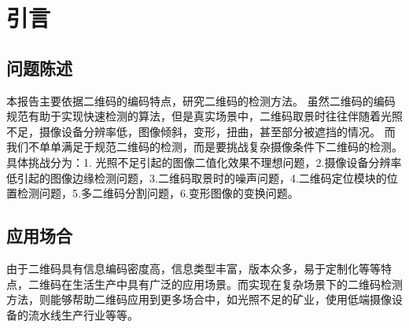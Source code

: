 \section{引言}
\subsection{问题陈述}
本报告主要依据二维码的编码特点，研究二维码的检测方法。
虽然二维码的编码规范有助于实现快速检测的算法，但是真实场景中，二维码取景时往往伴随着光照不足，摄像设备分辨率低，图像倾斜，变形，扭曲，甚至部分被遮挡的情况。
而我们不单单满足于规范二维码的检测，而是要挑战复杂摄像条件下二维码的检测。\\
具体挑战分为：1. 光照不足引起的图像二值化效果不理想问题，2.摄像设备分辨率低引起的图像边缘检测问题，3.二维码取景时的噪声问题，4.二维码定位模块的位置检测问题，5.多二维码分割问题，6.变形图像的变换问题。

\subsection{应用场合}
由于二维码具有信息编码密度高，信息类型丰富，版本众多，易于定制化等等特点，二维码在生活生产中具有广泛的应用场景。而实现在复杂场景下的二维码检测方法，则能够帮助二维码应用到更多场合中，如光照不足的矿业，使用低端摄像设备的流水线生产行业等等。
